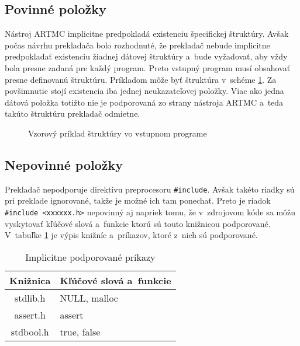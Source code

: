 \subsection{Povinné položky}
Nástroj ARTMC implicitne predpokladá existenciu špecifickej štruktúry. Avšak počas návrhu prekladača bolo rozhodnuté, že prekladač nebude implicitne predpokladať existenciu žiadnej dátovej štruktúry a~bude vyžadovať, aby vždy bola presne zadaná pre každý program. Preto vstupný program musí obsahovať presne definovanú štruktúru. Príkladom môže byť štruktúra v~schéme \ref{fig:struct}. Za povšimnutie stojí existencia iba jednej neukazateľovej položky. Viac ako jedna dátová položka totižto nie je podporovaná zo strany nástroja ARTMC a~teda takúto štruktúru prekladač odmietne.
\begin{center}
\begin{figure}[H]
\label{fig:struct}
\caption{Vzorový príklad štruktúry vo vstupnom programe}
\end{figure}
\end{center}

\subsection{Nepovinné položky}
Prekladač nepodporuje direktívu preprocesoru \texttt{\#include}. Avšak takéto riadky sú pri preklade ignorované, takže je možné ich tam ponechať. Preto je riadok \texttt{\#include <xxxxxx.h>} nepovinný aj napriek tomu, že v~zdrojovom kóde sa môžu vyskytovať kľúčové slová a~funkcie ktorú sú touto knižnicou podporované. V~tabuľke \ref{table:kniz} je výpis knižníc a~príkazov, ktoré z~nich sú podporované.

\begin{table}[H]
\centering
\begin{tabular}{c|l}
\textbf{Knižnica} & \textbf{Kľúčové slová a~funkcie} \\ \hline
stdlib.h          & NULL, malloc                      \\
assert.h          & assert                            \\
stdbool.h         & true, false                       \\
\end{tabular}
\caption{Implicitne podporované príkazy}
\label{table:kniz}
\end{table}


